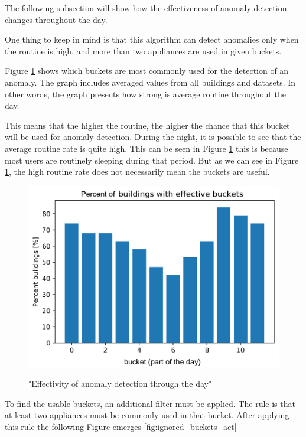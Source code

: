 The following subsection will show how the effectiveness of anomaly detection changes throughout the day.

One thing to keep in mind is that this algorithm can detect anomalies only when
the routine is high, and more than two appliances are used in given buckets.

Figure \ref{fig:ignored_buckets_22} shows which buckets are most commonly used for the detection of an anomaly.
The graph includes averaged values from all buildings and datasets. 
In other words, the graph presents how strong is average routine throughout the day.

This means that the higher the routine, the higher the chance that this bucket will be used for anomaly detection.
During the night, it is possible to see that the average routine rate is quite high.
This can be seen in Figure \ref{fig:ignored_buckets_22}
this is because most users are routinely sleeping during that period.
But as we can see in Figure \ref{fig:ignored_buckets_22},
the high routine rate does not necessarily mean the buckets are useful.

\begin{figure}[H]
	\centering
	\caption{"Effectivity of anomaly detection through the day"}
	\includegraphics[width=.8\textwidth]{Figures/EC/ignored_buckets_dist.png}
	\label{fig:ignored_buckets_22}
\end{figure}

To find the usable buckets, an additional filter must be applied.
The rule is that at least two appliances must be commonly used in that bucket. 
After applying this rule the following Figure emerges \ref{fig:ignored_buckets_act}

